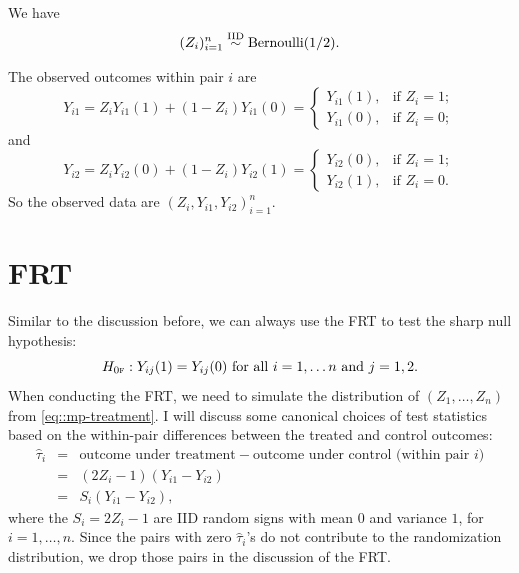 \begin{definition}
[MPE]
We have 
\begin{eqnarray}
 (Z_i)_{i=1}^n \iidsim \text{Bernoulli}(1/2).
 \label{eq::mp-treatment}
\end{eqnarray} 
\end{definition}

 
 
The observed outcomes within pair $i$ are 
$$
Y_{i1} = Z_i Y_{i1}(1) + (1-Z_i) Y_{i1}(0)
= \begin{cases}
   Y_{i1}(1),& \text{if } Z_i = 1; \\
   Y_{i1}(0), & \text{if } Z_i = 0; 
\end{cases}
$$
and
$$
Y_{i2} = Z_i Y_{i2}(0) + (1-Z_i) Y_{i2}(1)
= \begin{cases}
   Y_{i2}(0),& \text{if } Z_i = 1; \\
   Y_{i2}(1), & \text{if } Z_i = 0 . 
\end{cases} 
$$
So the observed data are $( Z_i, Y_{i1} , Y_{i2} )_{i=1}^n$.  
 
 
\section{FRT}
 
 Similar to the discussion before, we can always use the FRT to test the sharp null hypothesis: 
$$
H_{0\textsc{f}}: Y_{ij}(1) = Y_{ij}(0)  \text{ for all }  i=1,\ldots  n  \text{ and } j=1,2. 
$$
When conducting the FRT, we need to simulate the distribution of $(Z_1, \ldots, Z_n)$ from \eqref{eq::mp-treatment}. 
I will discuss some canonical choices of test statistics based on the within-pair differences between the treated and control outcomes:
\begin{eqnarray*}
\hat{\tau}_i &=& \text{outcome under treatment} - \text{outcome under control} \text{ (within pair } i) \\
&=&  (2Z_i - 1) (Y_{i1}  - Y_{i2})\\
&=& S_i (Y_{i1}  - Y_{i2})  , 
\end{eqnarray*}
where the $S_i = 2Z_i - 1$ are IID random signs with mean $0$ and variance $1$, for $i=1,\ldots, n$. 
 Since the pairs with zero $\hat{\tau}_i $'s do not contribute to the randomization distribution, we drop those pairs in the discussion of the FRT. 
 
